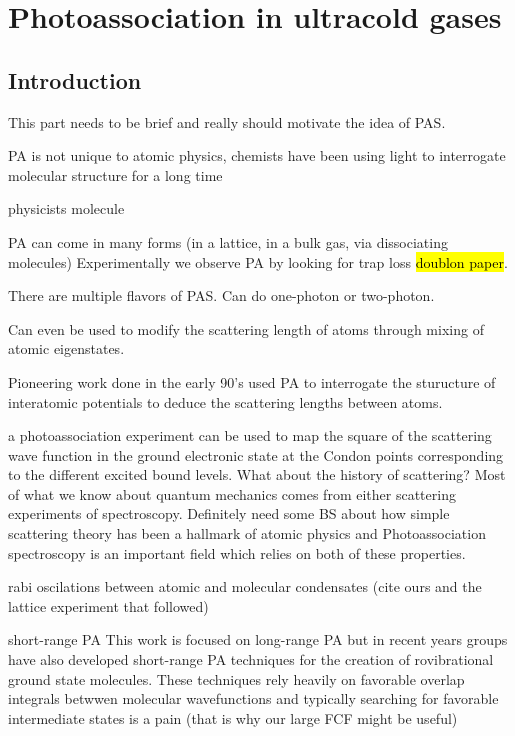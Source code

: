 \chapter{Photoassociation in ultracold gases}
\label{ch:chap3}

\section{Introduction}
\label{sec:pas_intro}

This part needs to be brief and really should motivate the idea of PAS.

PA is not unique to atomic physics, chemists have been using light to interrogate molecular structure for a long time

physicists molecule

PA can come in many forms (in a lattice, in a bulk gas, via dissociating molecules) Experimentally we observe PA by looking for trap loss \hl{doublon paper}.

There are multiple flavors of PAS. Can do one-photon or two-photon.

Can even be used to modify the scattering length of atoms through mixing of atomic eigenstates. 

Pioneering work done in the early 90's used PA to interrogate the sturucture of interatomic potentials to deduce the scattering lengths between atoms.

a photoassociation experiment can be used to map the square of the scattering wave function in the ground electronic state at the Condon points corresponding to the different excited bound levels. \cite{Borkowski2009}
What about the history of scattering? 
Most of what we know about quantum mechanics comes from either scattering experiments of spectroscopy. 
Definitely need some BS about how simple scattering theory has been a hallmark of atomic physics and 
Photoassociation spectroscopy is an important field which relies on both of these properties.
 
rabi oscilations between atomic and molecular condensates (cite ours and the lattice experiment that followed)

short-range PA
This work is focused on long-range PA but in recent years groups have also developed short-range PA techniques for the creation of rovibrational ground state molecules. These techniques rely heavily on favorable overlap integrals betwwen molecular wavefunctions and typically searching for favorable intermediate states is a pain (that is why our large FCF might be useful)

